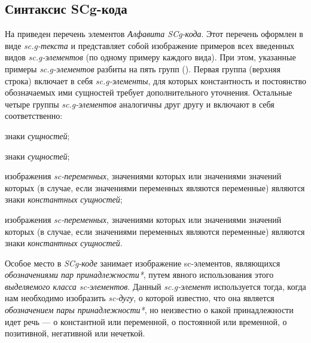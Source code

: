 \subsection{Синтаксис SCg-кода}
\label{sec_scg_syntax}

\begin{SCn}
\end{SCn}

На \textit{} приведен перечень элементов \textit{Алфавита SCg-кода\scnsupergroupsign}.
Этот перечень оформлен в виде \textit{sc.g-текста} и представляет собой изображение примеров всех введенных видов \textit{sc.g-элементов} (по одному примеру каждого вида). При этом, указанные примеры \textit{sc.g-элементов} разбиты на пять групп (\textit{}). Первая группа (верхняя строка) включает в себя \textit{sc.g-элементы}, для которых константность и постоянство обозначаемых ими сущностей требует дополнительного уточнения. Остальные четыре группы \textit{sc.g-элементов} аналогичны друг другу и включают в себя соответственно:

\begin{textitemize}
	\item знаки \textit{ сущностей};
	\item знаки \textit{ сущностей};
	\item изображения \textit{sc-переменных}, значениями которых или значениями значений которых (в случае, если значениями переменных являются переменные) являются знаки \textit{константных  сущностей};
	\item изображения \textit{sc-переменных}, значениями которых или значениями значений которых (в случае, если значениями переменных являются переменные) являются знаки \textit{константных  сущностей}.
\end{textitemize}

Особое место в \textit{SCg-коде} занимает изображение sc-элементов, являющихся \textit{обозначениями пар принадлежности*}, путем явного использования этого \textit { выделяемого класса sc-элементов}.
Данный \textit{sc.g-элемент} используется тогда, когда нам необходимо изобразить \textit{sc-дугу}, о которой известно, что она является \textit{обозначением пары принадлежности*}, но неизвестно о какой принадлежности идет речь --- о константной или переменной, о постоянной или временной, о позитивной, негативной или нечеткой.

